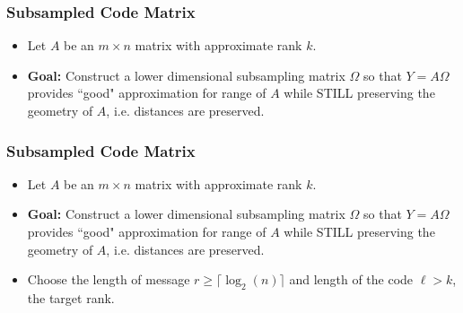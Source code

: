 \documentclass[9pt]{beamer}
\begin{document}
\begin{frame}
\frametitle{Subsampled Code Matrix} 
\begin{itemize} 
\item Let $A$ be an $m \times n$ matrix with approximate rank $k$.
\vspace{3mm}

\item \textbf{Goal:} Construct a lower dimensional subsampling matrix $\Omega$ so that $Y = A \Omega$ provides ``good" approximation for range of $A$ while STILL preserving the geometry of $A$, i.e. distances are preserved.
\vspace{3mm}

\end{itemize}
\end{frame}

\begin{frame}
\frametitle{Subsampled Code Matrix} 
\begin{itemize} 
\item Let $A$ be an $m \times n$ matrix with approximate rank $k$.
\vspace{3mm}

\item \textbf{Goal:} Construct a lower dimensional subsampling matrix $\Omega$ so that $Y = A \Omega$ provides ``good" approximation for range of $A$ while STILL preserving the geometry of $A$, i.e. distances are preserved.
\vspace{3mm}

\item Choose the length of message $r \ge \lceil \log_2(n) \rceil$ and length of the code $\ell > k$, the target rank.
\vspace{3mm}

\end{itemize}
\end{frame}
\end{document}
